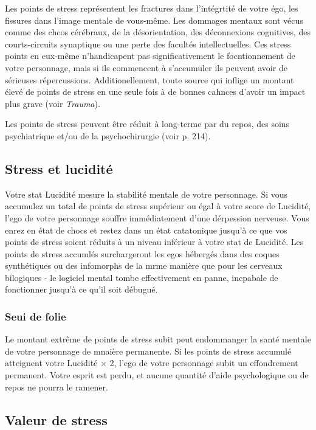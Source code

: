 Les points de stress représentent les fractures dans l'intégrtité de votre égo, les fissures dans l'image mentale de vous-même. Les dommages mentaux sont vécus comme des chcos cérébraux, de la désorientation, des déconnexions cognitives, des courts-circuits synaptique ou une perte des facultés intellectuelles. Ces stress points en eux-même n'handicapent pas significativement le focntionnement de votre personnage, mais si ils commencent à s'accumuler ils peuvent avoir de sérieuses répercussions. Additionellement, toute source qui inflige un montant élevé de points de stress en une seule fois à de bonnes cahnces d'avoir un impact plus grave (voir \emph{Trauma}). 

Les points de stress peuvent être réduit à long-terme par du repos, des soins psychiatrique et/ou de la psychochirurgie (voir p. 214). 

\subsection{Stress et lucidité} \label{sec:lucidity-stress} 

Votre stat Lucidité mesure la stabilité mentale de votre personnage. Si vous accumulez un total de points de stress supérieur ou égal à votre score de Lucidité, l'ego de votre personnage souffre immédiatement d'une dérpession nerveuse. Vous enrez en état de chocs et restez dans un état catatonique jusqu'à ce que vos points de stress soient réduits à un niveau inférieur à votre stat de Lucidité. Les points de stress accumlés surchargeront les egos hébergés dans des coques synthétiques ou des infomorphs de la mrme manière que pour les cerveaux bilogiques - le logiciel mental tombe effectivement en panne, incpabale de fonctionner jusqu'à ce qu'il soit débugué. 

\subsubsection{Seui de folie} 

Le montant extrême de points de stress subit peut endommanger la santé mentale de votre personnage de mnaière permanente. Si les points de stress accumulé atteignent votre Lucidité $\times$ 2, l'ego de votre personnage subit un effondrement permanent. Votre esprit est perdu, et aucune quantité d'aide psychologique ou de repos ne pourra le ramener. 

\subsection{Valeur de stress} \label{sec:stress-value} 

